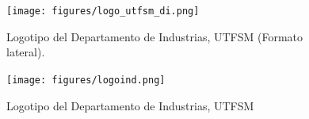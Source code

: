 \begin{figure}[ht!]
    \centering
    \texttt{[image: figures/logo\_utfsm\_di.png]}
    \caption{Logotipo del Departamento de Industrias, UTFSM (Formato lateral).}
    \label{fig:logodiutfsm}
\end{figure}

\begin{figure}[ht!]
\centering
\texttt{[image: figures/logoind.png]}
\caption{Logotipo del Departamento de Industrias, UTFSM }
\label{fig:logoind1}
\end{figure}

